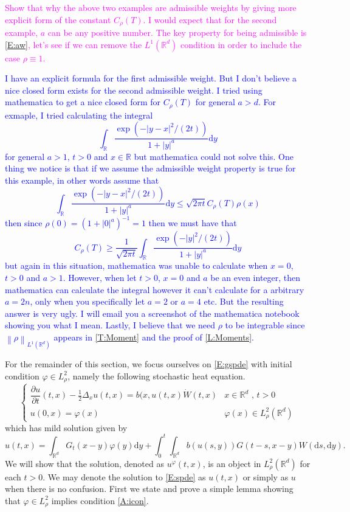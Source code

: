 \documentclass[a4paper,11pt]{article}
\numberwithin{equation}{section}
\theoremstyle{plain}
\theoremstyle{definition}
\newcommand{\R}{\mathbb{R}}
\newcommand{\Norm}[1]{\left\|  #1   \right\|}
\newcommand{\ud}{\ensuremath{\mathrm{d}}}
\begin{document}
\bigskip
\textcolor{magenta}{Show that why the above two examples are admissible weights by giving more explicit form of the constant $C_\rho(T)$.
I would expect that for the second example, $a$ can be any positive number.
The key property for being admissible is \eqref{E:aw}, let's see if we can remove the $L^1(\R^d)$ condition in order 
to include the case $\rho\equiv 1$.} 

\textcolor{blue}{I have an explicit formula for the first admissible weight. But I don't believe a nice closed form exists for the second admissible weight. I tried using mathematica to get a nice closed form for $C_\rho(T)$ for general $a>d$. For exmaple, I tried calculating the integral 
	\[
		\int_{\R}\frac{\exp \left(-|y-x|^2/(2t)\right)}{1+|y|^a} \ud y
	\]  
for general $a>1$, $t>0$ and $x\in \R$ but mathematica could not solve this. One thing we notice is that if we assume the admissible weight property is true for this example, in other words assume that 
	\[
		\int_{\R}\frac{\exp \left(-|y-x|^2/(2t)\right)}{1+|y|^a} \ud y \le \sqrt{2 \pi t}C_\rho(T)\rho(x)
	\]
then since $\rho(0)=(1+|0|^a)^{-1}=1$ then we must have that 
	\[
		C_\rho(T) \ge  \frac{1}{\sqrt{2 \pi t}}	\int_{\R}\frac{\exp \left(-|y|^2/(2t)\right)}{1+|y|^a} \ud y
	\]
but again in this situation, mathematica was unable to calculate when $x=0$, $t>0$ and $a>1$. However, when let $t>0$, $x=0$ and $a$ be an even integer, then mathematica can calculate the integral however it can't calculate for a arbitrary $a=2n$, only when you specifically let $a=2$ or $a=4$ etc. But the resulting answer is very ugly. I will email you a screenshot of the mathematica notebook showing you what I mean. Lastly, I believe that we need $\rho$ to be integrable since $\Norm{\rho}_{L^1(\R^d)}$ appears in \eqref{T:Moment} and the proof of \eqref{L:Moments}.}
\bigskip

For the remainder of this section, we focus ourselves on \eqref{E:gspde} with initial condition $\varphi \in L^2_\rho$,
namely the following stochastic heat equation. 
\begin{equation}
	\begin{cases}
	\dfrac{\partial u}{\partial t}(t,x)-\frac{1}{2}\Delta_x u(t,x) = b(x,u(t,x)\dot W(t,x) & \text{$x\in \R^d$ , $t>0$}
	\\ u(0,x)=\varphi(x) & \varphi(x) \in L^2_\rho(\R^d)
	\end{cases}  \label{E:spde}
\end{equation}
which has mild solution given by
\begin{equation}
	u(t,x)=\int_{\R^d}G_t(x-y)\varphi(y)\ud y + \int_0^t\int_{\R^d}b(u(s,y))G(t-s,x-y)W(\ud s,\ud y) \label{E:msol}.
\end{equation}
We will show that the solution, denoted as $u^\varphi(t,x)$, is an object in $L^2_\rho(\R^d)$ for each $t>0$. We may
denote the solution to \eqref{E:spde} as $u(t,x)$ or simply as $u$ when there is no confusion. First we state and prove
a simple lemma showing that $\varphi \in L^2_\rho$ implies condition \eqref{A:icon}.
\end{document}
